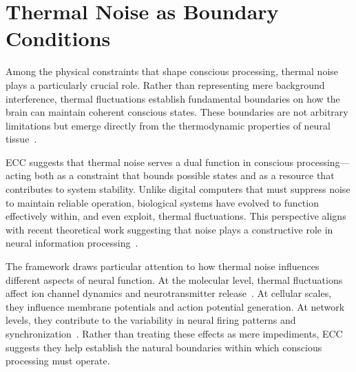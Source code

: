 \section{Thermal Noise as Boundary Conditions~}

Among the physical constraints that shape conscious processing, thermal noise plays a particularly crucial role. Rather than representing mere background interference, thermal fluctuations establish fundamental boundaries on how the brain can maintain coherent conscious states. These boundaries are not arbitrary limitations but emerge directly from the thermodynamic properties of neural tissue~\cite{faisal2008, mcdonnell2011}.

ECC suggests that thermal noise serves a dual function in conscious processing—acting both as a constraint that bounds possible states and as a resource that contributes to system stability. Unlike digital computers that must suppress noise to maintain reliable operation, biological systems have evolved to function effectively within, and even exploit, thermal fluctuations. This perspective aligns with recent theoretical work suggesting that noise plays a constructive role in neural information processing~\cite{mcdonnell2009, gammaitoni1998}.

The framework draws particular attention to how thermal noise influences different aspects of neural function. At the molecular level, thermal fluctuations affect ion channel dynamics and neurotransmitter release~\cite{attwell2001, laughlin2001}. At cellular scales, they influence membrane potentials and action potential generation. At network levels, they contribute to the variability in neural firing patterns and synchronization~\cite{pinotsis2023cytoelectric}. Rather than treating these effects as mere impediments, ECC suggests they help establish the natural boundaries within which conscious processing must operate.

